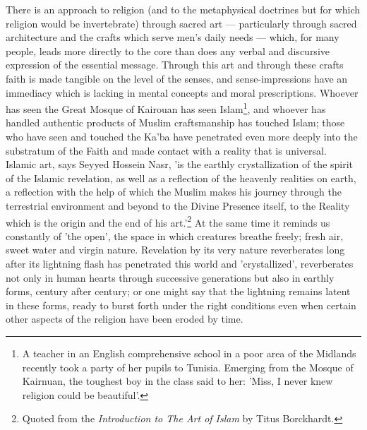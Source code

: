 \documentclass[11pt, b5paper, twoside]{book}
\begin{document}
There is an approach to religion (and to the metaphysical doctrines but for which religion would be 
invertebrate) through sacred art --- particularly through sacred architecture and the crafts which 
serve men's daily needs --- which, for many people, leads more directly to the core than does any 
verbal and discursive expression of the essential message. Through this art and through these crafts 
faith is made tangible on the level of the senses, and sense-impressions have an immediacy which is 
lacking in mental concepts and moral prescriptions. Whoever has seen the Great Mosque of Kairouan has 
seen Islam\footnote{A teacher in an English comprehensive school in a poor area of the Midlands recently took a party 
of her pupils to Tunisia. Emerging from the Mosque of Kairnuan, the toughest boy in the class said to 
her: 'Miss, I never knew religion could be beautiful'.}, and whoever has handled authentic products of Muslim craftsmanship has touched Islam; 
those who have seen and touched the Ka'ba have penetrated even more deeply into the substratum of the 
Faith and made contact with a reality that is universal. \\

Islamic art, says Seyyed Hossein Nasr, 'is the earthly crystallization of the spirit of the Islamic 
revelation, as well as a reflection of the heavenly realities on earth, a reflection with the help of 
which the Muslim makes his journey through the terrestrial environment and beyond to the Divine 
Presence itself, to the Reality which is the origin and the end of his art.'\footnote{Quoted from the \emph{Introduction to The Art of Islam} by Titus Borckhardt.} At the same time it 
reminds us constantly of 'the open', the space in which creatures breathe freely; fresh air, sweet 
water and virgin nature. Revelation by its very nature reverberates long after its lightning flash 
has penetrated this world and 'crystallized', reverberates not only in human hearts through 
successive generations but also in earthly forms, century after century; or one might say that the 
lightning remains latent in these forms, ready to burst forth under the right conditions even when 
certain other aspects of the religion have been eroded by time. \\
\end{document}
